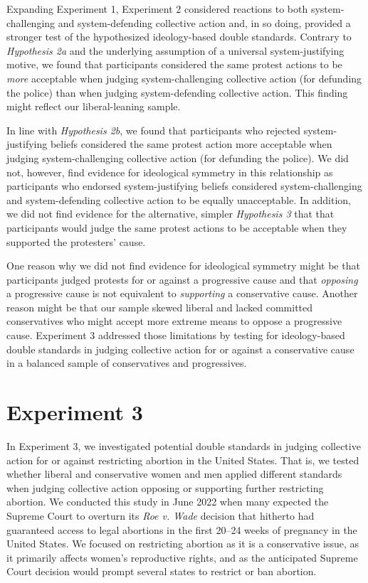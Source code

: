 \documentclass[twocolumn, 11pt, letterpaper]{article}
\begin{document}
Expanding Experiment 1, Experiment 2 considered reactions to both
system-challenging and system-defending collective action and, in so
doing, provided a stronger test of the hypothesized ideology-based
double standards. Contrary to \emph{Hypothesis 2a} and the underlying
assumption of a universal system-justifying motive, we found that
participants considered the same protest actions to be \emph{more}
acceptable when judging system-challenging collective action (for
defunding the police) than when judging system-defending collective
action. This finding might reflect our liberal-leaning sample.

In line with \emph{Hypothesis 2b}, we found that participants who
rejected system-justifying beliefs considered the same protest action
more acceptable when judging system-challenging collective action (for
defunding the police). We did not, however, find evidence for
ideological symmetry in this relationship as participants who endorsed
system-justifying beliefs considered system-challenging and
system-defending collective action to be equally unacceptable. In
addition, we did not find evidence for the alternative, simpler
\emph{Hypothesis 3} that that participants would judge the same protest
actions to be acceptable when they supported the protesters' cause.

One reason why we did not find evidence for ideological symmetry might
be that participants judged protests for or against a progressive cause
and that \emph{opposing} a progressive cause is not equivalent to
\emph{supporting} a conservative cause. Another reason might be that our
sample skewed liberal and lacked committed conservatives who might
accept more extreme means to oppose a progressive cause. Experiment 3
addressed those limitations by testing for ideology-based double
standards in judging collective action for or against a conservative
cause in a balanced sample of conservatives and progressives.

\hypertarget{experiment-3}{%
\section{Experiment 3}\label{experiment-3}}

In Experiment 3, we investigated potential double standards in judging
collective action for or against restricting abortion in the United
States. That is, we tested whether liberal and conservative women and
men applied different standards when judging collective action opposing
or supporting further restricting abortion. We conducted this study in
June 2022 when many expected the Supreme Court to overturn its \emph{Roe
v. Wade} decision that hitherto had guaranteed access to legal abortions
in the first 20--24 weeks of pregnancy in the United States. We focused
on restricting abortion as it is a conservative issue, as it primarily
affects women's reproductive rights, and as the anticipated Supreme
Court decision would prompt several states to restrict or ban abortion.
\end{document}
